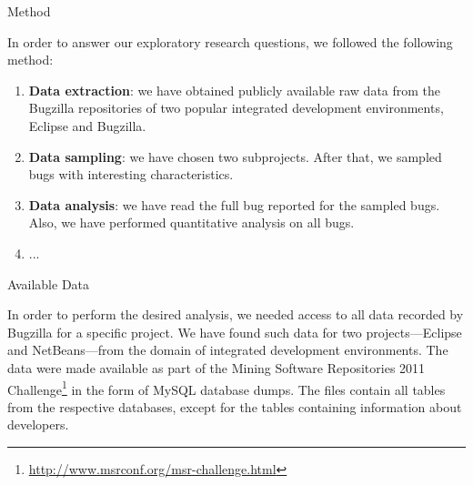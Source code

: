 \begin{section}{Method}


In order to answer our exploratory research questions, we followed the following method:

\begin{enumerate}
	\item \textbf{Data extraction}: we have obtained publicly available raw data from the Bugzilla repositories of two popular integrated development environments, Eclipse and Bugzilla.
	
	\item \textbf{Data sampling}: we have chosen two subprojects. After that, we sampled bugs with interesting characteristics.
	
	\item \textbf{Data analysis}: we have read the full bug reported for the sampled bugs. Also, we have performed quantitative analysis on all bugs.
	
	\item ...
\end{enumerate}

\begin{subsection}{Available Data}
	
	In order to perform the desired analysis, we needed access to all data recorded by Bugzilla for a specific project. We have found such data for two projects---Eclipse and NetBeans---from the domain of integrated development environments. The data were made available as part of the Mining Software Repositories 2011 Challenge\footnote{\url{http://www.msrconf.org/msr-challenge.html}} in the form of MySQL database dumps. The files contain all tables from the respective databases, except for the tables containing information about developers.
	


\end{subsection}
\end{section}
